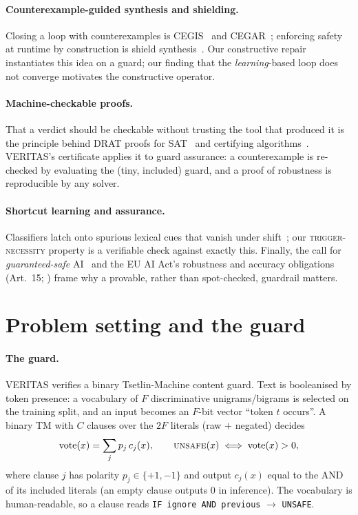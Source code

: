 \documentclass[11pt]{article}
\begin{document}
\paragraph{Counterexample-guided synthesis and shielding.} Closing a loop with
counterexamples is CEGIS~\citep{solar2006combinatorial} and
CEGAR~\citep{clarke2000cegar}; enforcing safety at runtime by construction is shield
synthesis~\citep{bloem2015shield,alshiekh2018safe}. Our constructive repair
instantiates this idea on a guard; our finding that the \emph{learning}-based loop
does not converge motivates the constructive operator.

\paragraph{Machine-checkable proofs.} That a verdict should be checkable without
trusting the tool that produced it is the principle behind DRAT proofs for
SAT~\citep{wetzler2014drat} and certifying algorithms~\citep{mcconnell2011certifying}.
VERITAS's certificate applies it to guard assurance: a counterexample is re-checked
by evaluating the (tiny, included) guard, and a proof of robustness is reproducible
by any solver.

\paragraph{Shortcut learning and assurance.} Classifiers latch onto spurious
lexical cues that vanish under shift~\citep{geirhos2020shortcut,mccoy2019right}; our
\textsc{trigger-necessity} property is a verifiable check against exactly this.
Finally, the call for \emph{guaranteed-safe} AI~\citep{dalrymple2024guaranteed} and
the EU AI Act's robustness and accuracy obligations (Art.~15;
\citealp{euaiact2024}) frame why a provable, rather than spot-checked, guardrail
matters.

\section{Problem setting and the guard}
\label{sec:setting}

\paragraph{The guard.} VERITAS verifies a binary Tsetlin-Machine content guard.
Text is booleanised by token presence: a vocabulary of $F$ discriminative
unigrams/bigrams is selected on the training split, and an input becomes an
$F$-bit vector ``token $t$ occurs''. A binary TM with $C$ clauses over the $2F$
literals (raw $+$ negated) decides
\begin{equation}
\mathrm{vote}(x) = \sum_{j} p_j\, c_j(x),\qquad
\textsc{unsafe}(x) \iff \mathrm{vote}(x) > 0,
\label{eq:vote}
\end{equation}
where clause $j$ has polarity $p_j\in\{+1,-1\}$ and output $c_j(x)$ equal to the AND
of its included literals (an empty clause outputs $0$ in inference). The vocabulary
is human-readable, so a clause reads \texttt{IF ignore AND previous} $\rightarrow$
\texttt{UNSAFE}.
\end{document}
